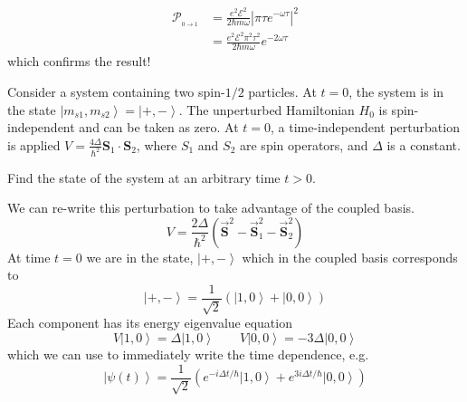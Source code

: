 \documentclass[a4paper, 11pt]{article}
\newcommand{\E}{\mathcal{E}}
\newcommand{\prob}[2]{\mathcal{P}_{_{#1\rightarrow #2}}}
\newcommand{\ket}[1]{\ensuremath{\left|#1\right\rangle}}
\newcommand{\bvec}[1]{\vec{\boldsymbol{#1}}}
\newenvironment{solution}{%
	\begin{list}{}{%
			\setlength{\topsep}{0pt}%
			\setlength{\leftmargin}{0.5cm}%
			\setlength{\rightmargin}{0.5cm}%
			\setlength{\listparindent}{\parindent}%
			\setlength{\itemindent}{\parindent}%
			\setlength{\parsep}{\parskip}%
		}%
		\item[]}{\end{list}}
\begin{document}
\begin{enumerate}[leftmargin=0em, label=\textbf{\arabic*}]
\begin{solution}
      \begin{align}
        \prob{0}{1} &=\frac{e^2\E^2}{2\hbar m\omega}\left| \pi\tau e^{-\omega \tau} \right|^2 \\
        &= \frac{e^2\E^2\pi^2\tau^2}{2\hbar m\omega}e^{-2\omega\tau}
      \end{align}
      which confirms the result! \\
    \end{solution}

    \item Consider a system containing two spin-$1/2$ particles. At $t=0$, the
      system is in the state $\ket{m_{s1}, m_{s2}}=\ket{+,-}$. The unperturbed
      Hamiltonian $H_0$ is spin-independent and can be taken as zero. At $t=0$,
      a time-independent perturbation is applied
      $V=\frac{4\Delta}{\hbar^2}\mathbf{S}_1\cdot\mathbf{S}_2$, where $S_1$ and
      $S_2$ are spin operators, and $\Delta$ is a constant.
      \begin{enumerate}[leftmargin=2em, label=(\textbf{\alph*})]
        \item Find the state of the system at an arbitrary time $t>0$.\\
          \begin{solution}
            We can re-write this perturbation to take advantage of the coupled
            basis.
            \begin{equation}
              V = \frac{2\Delta}{\hbar^2}\left( \bvec{S}^2-\bvec{S}_1^2-\bvec{S}_2^2 \right)
            \end{equation}
            At time $t=0$ we are in the state, $\ket{+,-}$ which in the coupled
            basis corresponds to
            \begin{equation}
              \ket{+,-} = \frac{1}{\sqrt{2}}(\ket{1,0}+\ket{0,0})
            \end{equation}
            Each component has its energy eigenvalue equation
            \begin{equation}
              V\ket{1,0} = \Delta \ket{1,0} \qquad V\ket{0,0}=-3\Delta\ket{0,0}
            \end{equation}
            which we can use to immediately write the time dependence, e.g.
            \begin{equation}
              \ket{\psi(t)} = \frac{1}{\sqrt{2}}\left(e^{-i\Delta t/\hbar}\ket{1,0}+e^{3i\Delta t/\hbar}\ket{0,0}  \right)
            \end{equation}
            

\end{solution}
\end{enumerate}
\end{enumerate}
\end{document}
